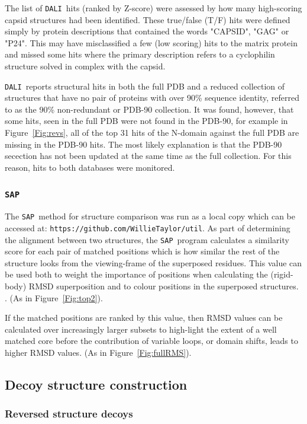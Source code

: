 \documentclass{bmcart}
\newcommand{\SAP}{{\tt SAP}}
\newcommand{\DALI}{{\tt DALI}}
\newcommand{\Fig}[1]{Figure~\ref{Fig:#1}}
\begin{document}
The list of \DALI\ hits (ranked by Z-score) were assessed by how many high-scoring capsid structures had
been identified.    These true/false (T/F) hits were defined simply by protein descriptions that contained the
words "CAPSID", "GAG" or "P24".   This may have misclassified a few (low scoring) hits to the matrix protein
and missed some hits where the primary description refers to a cyclophilin structure solved in complex
with the capsid.

\DALI\ reports structural hits in both the full PDB and a reduced collection of structures that
have no pair of proteins with over 90\% sequence identity, referred to as the 90\% non-redundant or PDB-90 collection.
It was found, however, that some hits, seen in the full PDB were not found in the PDB-90, for example in \Fig{revs},
all of the top 31 hits of the N-domain against the full PDB are missing in the PDB-90 hits.
The most likely explanation is that the PDB-90 secection has not been updated at the same time
as the full collection.    For this reason, hits to both databases were monitored.

\subsubsection*{\SAP}

The \SAP\ method for structure comparison \cite{TaylorWR99a} was run as a local copy which can
be accessed at: {\tt https://github.com/WillieTaylor/util}.  
As part of determining the alignment between two structures,
the \SAP\ program calculates a similarity score for each pair of matched positions which is
how similar the rest of the structure looks from the viewing-frame of the superposed residues.
This value can be used both to weight the importance of positions when calculating the
(rigid-body) RMSD superposition and to colour positions in the superposed structures.
\cite{RippmannFet91a}. (As in \Fig{top2}).

If the matched positions are ranked by this value, then RMSD values can be calculated over
increasingly larger subsets to high-light the extent of a well matched core before
the contribution of variable loops, or domain shifts, leads to higher RMSD values.
(As in \Fig{fullRMS}).

\subsection*{Decoy structure construction}

\subsubsection*{Reversed structure decoys}
\end{document}

